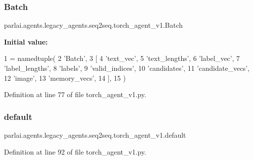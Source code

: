 \subsubsection{\texorpdfstring{Batch}{Batch}}
{\footnotesize\ttfamily parlai.\+agents.\+legacy\+\_\+agents.\+seq2seq.\+torch\+\_\+agent\+\_\+v1.\+Batch}

{\bfseries Initial value\+:}
\begin{DoxyCode}
1 =  namedtuple(
2     \textcolor{stringliteral}{'Batch'},
3     [
4         \textcolor{stringliteral}{'text\_vec'},
5         \textcolor{stringliteral}{'text\_lengths'},
6         \textcolor{stringliteral}{'label\_vec'},
7         \textcolor{stringliteral}{'label\_lengths'},
8         \textcolor{stringliteral}{'labels'},
9         \textcolor{stringliteral}{'valid\_indices'},
10         \textcolor{stringliteral}{'candidates'},
11         \textcolor{stringliteral}{'candidate\_vecs'},
12         \textcolor{stringliteral}{'image'},
13         \textcolor{stringliteral}{'memory\_vecs'},
14     ],
15 )
\end{DoxyCode}


Definition at line 77 of file torch\+\_\+agent\+\_\+v1.\+py.

\mbox{\label{namespaceparlai_1_1agents_1_1legacy__agents_1_1seq2seq_1_1torch__agent__v1_a5d17ee55b86a7e7ee0de4dca59bf3bdc}} 
\subsubsection{\texorpdfstring{default}{default}}
{\footnotesize\ttfamily parlai.\+agents.\+legacy\+\_\+agents.\+seq2seq.\+torch\+\_\+agent\+\_\+v1.\+default}



Definition at line 92 of file torch\+\_\+agent\+\_\+v1.\+py.

\mbox{\label{namespaceparlai_1_1agents_1_1legacy__agents_1_1seq2seq_1_1torch__agent__v1_a2689006ea97d09413fb242f984bd8016}} 
